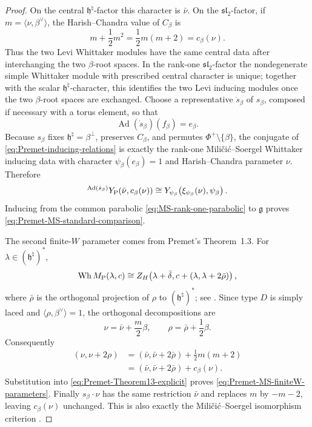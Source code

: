 \documentclass[11pt]{amsart}
\theoremstyle{remark}
\numberwithin{equation}{section}
\begin{document}
\begin{proof}
On the central \(\mathfrak h^\natural\)-factor this character is
\(\bar\nu\).  On the \(\mathfrak{sl}_2\)-factor, if
\(m=\langle\nu,\beta^\vee\rangle\), the Harish--Chandra value of
\(C_\beta\) is
\[
   m+\frac12m^2=\frac12m(m+2)=c_\beta(\nu).
\]
Thus the two Levi Whittaker modules have the same central data after
interchanging the two \(\beta\)-root spaces.  In the rank-one
\(\mathfrak{sl}_2\)-factor the nondegenerate simple Whittaker module with
prescribed central character is unique; together with the scalar
\(\mathfrak h^\natural\)-character, this identifies the two Levi inducing
modules once the two \(\beta\)-root spaces are exchanged.  Choose a representative
\(\dot s_\beta\) of \(s_\beta\), composed if necessary with a torus element,
so that
\[
   \operatorname{Ad}(\dot s_\beta)(f_\beta)=e_\beta.
\]
Because \(s_\beta\) fixes \(\mathfrak h^\natural=\beta^\perp\), preserves
\(C_\beta\), and permutes \(\Phi^+\setminus\{\beta\}\), the conjugate of
\eqref{eq:Premet-inducing-relations} is exactly the rank-one
Mili\v{c}i\'c--Soergel Whittaker inducing data with character
\(\psi_\beta(e_\beta)=1\) and Harish--Chandra parameter \(\nu\).  Therefore
\[
   {}^{\operatorname{Ad}(\dot s_\beta)}
   Y_{\rm P}\!\left(\bar\nu,c_\beta(\nu)\right)
   \cong
   Y_{\psi_\beta}\!\left(\xi_{\psi_\beta}(\nu),\psi_\beta\right).
\]
Inducing from the common parabolic \eqref{eq:MS-rank-one-parabolic} to
\(\mathfrak g\) proves \eqref{eq:Premet-MS-standard-comparison}.

The second finite-\(W\) parameter comes from Premet's Theorem~1.3.  For
\(\lambda\in(\mathfrak h^\natural)^*\),
\begin{equation}
\label{eq:Premet-Theorem13-explicit}
   \operatorname{Wh}M_{\rm P}(\lambda,c)
   \cong
   Z_H\!\left(
      \lambda+\bar\delta,
      c+(\lambda,\lambda+2\bar\rho)
   \right),
\end{equation}
where \(\bar\rho\) is the orthogonal projection of \(\rho\) to
\((\mathfrak h^\natural)^*\); see \cite[Theorem~1.3]{Premet2007}.
Since type \(D\) is simply laced and
\(\langle\rho,\beta^\vee\rangle=1\), the orthogonal decompositions are
\[
   \nu=\bar\nu+\frac m2\beta,
   \qquad
   \rho=\bar\rho+\frac12\beta.
\]
Consequently
\begin{align}
   (\nu,\nu+2\rho)
   &=
   (\bar\nu,\bar\nu+2\bar\rho)
   +\frac12m(m+2) \\
   &=
   (\bar\nu,\bar\nu+2\bar\rho)+c_\beta(\nu).
\end{align}
Substitution into \eqref{eq:Premet-Theorem13-explicit} proves
\eqref{eq:Premet-MS-finiteW-parameters}.
Finally \(s_\beta\mathbin\cdot\nu\) has the same restriction
\(\bar\nu\) and replaces \(m\) by \(-m-2\), leaving
\(c_\beta(\nu)\) unchanged.  This is also exactly the
Mili\v{c}i\'c--Soergel isomorphism criterion
\cite[Proposition~2.1]{MilicicSoergel1997}.
\end{proof}
\end{document}
